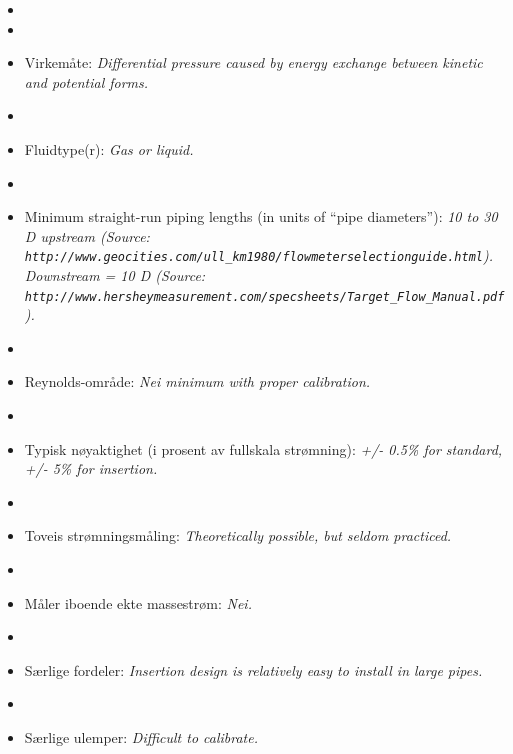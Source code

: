 \begin{itemize}
\goodbreak
\item{} 
\vskip 5pt
\item\item{} Virkemåte: {\it Differential pressure caused by energy exchange between kinetic and potential forms.}
\vskip 5pt
\item\item{} Fluidtype(r): {\it Gas or liquid.}
\vskip 5pt
\item\item{} Minimum straight-run piping lengths (in units of ``pipe diameters''): {\it 10 to 30 D upstream (Source: {\tt http://www.geocities.com/ull\_km1980/flowmeterselectionguide.html}).  Downstream = 10 D (Source: {\tt http://www.hersheymeasurement.com/specsheets/Target\_Flow\_Manual.pdf}).}
\vskip 5pt
\item\item{} Reynolds-område: {\it Nei minimum with proper calibration.}
\vskip 5pt
\item\item{} Typisk nøyaktighet (i prosent av fullskala strømning): {\it +/- 0.5\% for standard, +/- 5\% for insertion.}
\vskip 5pt
\item\item{} Toveis strømningsmåling: {\it Theoretically possible, but seldom practiced.}
\vskip 5pt
\item\item{} Måler iboende ekte massestrøm: {\it Nei.}
\vskip 5pt
\item\item{} Særlige fordeler: {\it Insertion design is relatively easy to install in large pipes.}
\vskip 5pt
\item\item{} Særlige ulemper: {\it Difficult to calibrate.}
\end{itemize}

